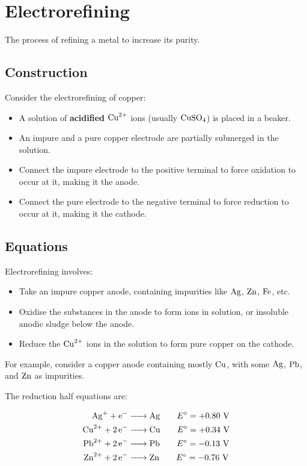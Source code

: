 \documentclass[a4paper,11pt]{article}
\begin{document}
\section{Electrorefining}

The process of refining a metal to increase its purity.

\subsection{Construction}


Consider the electrorefining of copper:

\begin{itemize}
\item A solution of \textbf{acidified} $\ce{Cu^{2+}}$ ions (usually
	$\ce{CuSO4}$) is placed in a beaker.
\item An impure and a pure copper electrode are partially submerged in the
	solution.
\item Connect the impure electrode to the positive terminal to force oxidation
	to occur at it, making it the anode.
\item Connect the pure electrode to the negative terminal to force reduction
	to occur at it, making it the cathode.
\end{itemize}

\subsection{Equations}

Electrorefining involves:

\begin{itemize}
\item Take an impure copper anode, containing impurities like $\ce{Ag}$,
	$\ce{Zn}$, $\ce{Fe}$, etc.
\item Oxidise the substances in the anode to form ions in solution, or
	insoluble anodic sludge below the anode.
\item Reduce the $\ce{Cu^{2+}}$ ions in the solution to form pure copper on the
	cathode.
\end{itemize}

For example, consider a copper anode containing mostly $\ce{Cu}$, with some
$\ce{Ag}$, $\ce{Pb}$, and $\ce{Zn}$ as impurities.

The reduction half equations are:

$$
\begin{aligned}
\ce{Ag+ + e- & -> Ag} \qquad E^\circ = +0.80\text{ V} \\
\ce{Cu^{2+} + 2e- & -> Cu} \qquad E^\circ = +0.34\text{ V} \\
\ce{Pb^{2+} + 2e- & -> Pb} \qquad E^\circ = -0.13\text{ V} \\
\ce{Zn^{2+} + 2e- & -> Zn} \qquad E^\circ = -0.76\text{ V} \\
\end{aligned}
$$
\end{document}

